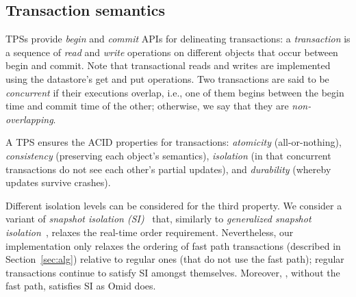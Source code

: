 \subsection{Transaction semantics} \label{ssec:transactions}

TPSs provide \emph{begin} and \emph{commit} APIs for delineating transactions: 
a \emph{transaction} is a sequence of \emph{read} and \emph{write} operations on different objects 
that occur between begin and commit. Note that transactional reads and writes are implemented using the 
datastore's get and put operations.
Two transactions are said to be \emph{concurrent} if 
their executions overlap, i.e., one of them begins between the begin time and commit time of the other;
otherwise, we say that they are \emph{non-overlapping}.

A TPS  ensures the ACID properties for transactions:
\emph{atomicity} (all-or-nothing), \emph{consistency} (preserving each object's semantics), 
\emph{isolation} (in that concurrent transactions do not see each other's partial updates), and 
\emph{durability} (whereby updates survive crashes).

Different isolation levels can be considered for the third property. We consider a variant of 
\emph{snapshot isolation (SI)}~\cite{DBLP:conf/sigmod/BerensonBGMOO95} that, similarly to \emph{generalized snapshot isolation}~\cite{DBLP:conf/srds/ElniketyZP05}, relaxes  the real-time order requirement. 
Nevertheless, our implementation only relaxes the ordering of fast path  transactions (described in Section~\ref{sec:alg}) 
relative to regular ones (that do not use the fast path); regular transactions continue to satisfy SI amongst themselves. 
Moreover, \sysll, without the fast path, satisfies SI as Omid does.

